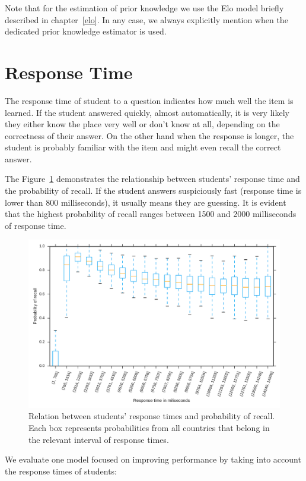 Note that for the estimation of prior knowledge we use the Elo model briefly described in chapter~\ref{elo}. In any case, we always explicitly mention when the dedicated prior knowledge estimator is used.

\section{Response Time}

The response time of student to a question indicates how much well the item is learned. If the student answered quickly, almost automatically, it is very likely they either know the place very well or don't know at all, depending on the correctness of their answer. On the other hand when the response is longer, the student is probably familiar with the item and might even recall the correct answer.

The Figure~\ref{fig-response-time} demonstrates the relationship between students' response time and the probability of recall. If the student answers suspiciously fast (response time is lower than 800 milliseconds), it usually means they are guessing. It is evident that the highest probability of recall ranges between 1500 and 2000 milliseconds of response time.

\begin{figure}[htbp]
  \centering
  \includegraphics[width=\textwidth]{img/response-time}
  \caption{Relation between students' response times and probability of recall. Each box represents probabilities from all countries that belong in the relevant interval of response times.}
  \label{fig-response-time}
\end{figure}

We evaluate one model focused on improving performance by taking into account the response times of students:

